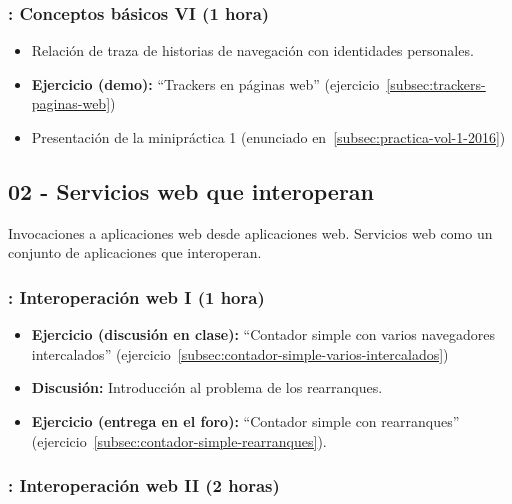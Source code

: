 \documentclass[a4paper,12pt]{article}
\begin{document}
\subsubsection{\juevesF: Conceptos básicos VI (1 hora)}
\label{cal:juevesFb}

\begin{itemize}
\item Relación de traza de historias de navegación con identidades personales.
\item \textbf{Ejercicio (demo):} ``Trackers en páginas web'' (ejercicio~\ref{subsec:trackers-paginas-web})
\item Presentación de la minipráctica 1 (enunciado en~\ref{subsec:practica-vol-1-2016})
\end{itemize}


\subsection{02 - Servicios web que interoperan}

Invocaciones a aplicaciones web desde aplicaciones web. Servicios web como un conjunto de aplicaciones que interoperan.

\subsubsection{\juevesF: Interoperación web I (1 hora)}
\label{cal:juevesF}

\begin{itemize}
\item \textbf{Ejercicio (discusión en clase):} ``Contador simple con varios 
navegadores intercalados'' (ejercicio~\ref{subsec:contador-simple-varios-intercalados})
\item \textbf{Discusión:} Introducción al problema de los rearranques.
\item \textbf{Ejercicio (entrega en el foro):} ``Contador simple con rearranques'' (ejercicio~\ref{subsec:contador-simple-rearranques}).
\end{itemize}

\subsubsection{\martesH: Interoperación web II (2 horas)}
\label{cal:martesH}
\end{document}
